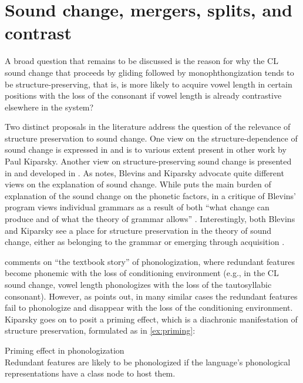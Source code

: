 \documentclass[output=paper,
modfonts
]{LSP/langsci}
\begin{document}
\section{Sound change, mergers, splits, and contrast}

A broad question that remains to be discussed is the reason for why the
CL sound change that proceeds by gliding followed by monophthongization
\citep{deChene1979} tends to be structure-preserving, that is,
is more likely to acquire vowel length in certain positions with the
loss of the consonant if vowel length is already contrastive elsewhere
in the system?

Two distinct proposals in the literature address the question of the
relevance of structure preservation to sound change. One view on the
structure-dependence of sound change is expressed in \citet{kiparsky1995,kiparsky2003} and is to various extent present in other work by Paul Kiparsky.
Another view on structure-preserving sound change is presented in
\citet{blevins2004a} and developed in \citet{blevins2009k}. As \citet{anderson2016k}
notes, Blevins and Kiparsky advocate quite different views on the
explanation of sound change. While \citet{blevins2004a,blevins2006b} puts the main
burden of explanation of the sound change on the phonetic factors,
\citet{kiparsky2006} in a critique of Blevins' program views individual
grammars as a result of both ``what change can produce and of what the
theory of grammar allows'' \citep[17]{anderson2016k}. Interestingly, both
Blevins and Kiparsky see a place for structure preservation in the
theory of sound change, either as belonging to the grammar \citep{kiparsky1995,kiparsky2003} or emerging through acquisition \citep{blevins2004a,blevins2009k}.

\citet[328]{kiparsky2003} comments on ``the textbook story'' of
phonologization, where redundant features become phonemic with the loss
of conditioning environment (e.g., in the CL sound change, vowel length
phonologizes with the loss of the tautosyllabic consonant). However, as
\citet{kiparsky2003} points out, in many similar cases the redundant features
fail to phonologize and disappear with the loss of the conditioning
environment. Kiparsky goes on to posit a priming effect, which is a
diachronic manifestation of structure preservation, formulated as in
\cref{ex:priming}:

\ea\label{ex:priming}Priming effect in phonologization \citep[328]{kiparsky2003}\\
Redundant features are likely to be phonologized if the language's phonological representations have a class node to host them.
\z
\end{document}
